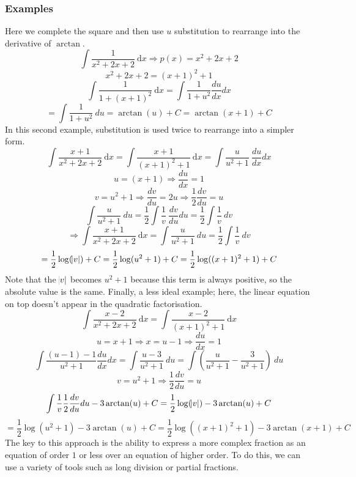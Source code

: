 \documentclass[12pt]{report}
\newcommand{\dx}{\:\mathrm{d}x}
\begin{document}
\begin{flushleft}
\subsubsection*{Examples}
Here we complete the square and then use \(u\) substitution to rearrange into
the derivative of \(\arctan\).
\[\int \frac{1}{x^2 + 2x + 2} \dx\Rightarrow p(x) = x^2 + 2x + 2\]
\[x^2 + 2x + 2 = (x + 1)^2 + 1\]
\[\int \frac{1}{1 + (x + 1)^2} \dx = \int \frac{1}{1 + u^2} \frac{du}{dx}dx\]
\[= \int \frac{1}{1 + u^2} \:du = \arctan(u) + C = \arctan(x + 1) + C\]
In this second example, substitution is used twice to rearrange into a simpler
form.
\[\int \frac{x + 1}{x^2 + 2x + 2} \dx = \int \frac{x + 1}{(x + 1)^2 + 1}\dx
= \int \frac{u}{u^2 + 1} \:\frac{du}{dx}dx\]
\[u = (x + 1) \Rightarrow \frac{du}{dx} = 1\]
\[v = u^2 + 1 \Rightarrow \frac{dv}{du} 
= 2u \Rightarrow \frac{1}{2}\frac{dv}{du} = u\]
\[\int \frac{u}{u^2 + 1} \:du = \frac{1}{2}\int\frac{1}{v}\:\frac{dv}{du}du
= \frac{1}{2}\int \frac{1}{v} \:dv\]
\[\Rightarrow \int \frac{x + 1}{x^2 + 2x + 2} \dx 
= \int \frac{u}{u^2 + 1} \:du = \frac{1}{2}\int \frac{1}{v} \:dv\]
\[= \frac{1}{2}\log(\abs{v}) + C = \frac{1}{2}\log(u^2 + 1) + C
= \frac{1}{2}\log((x + 1)^2 + 1) + C\]
Note that the \(\abs{v}\) becomes \(u^2 + 1\) because this term is always
positive, so the absolute value is the same. Finally, a less ideal example;
here, the linear equation on top doesn't appear in the quadratic factorisation.
\[\int\frac{x - 2}{x^2 + 2x + 2} \dx = \int\frac{x - 2}{(x + 1)^2 + 1} \dx\]
\[u = x + 1 \Rightarrow x = u - 1 \Rightarrow \frac{du}{dx} = 1\]
\[\int\frac{(u - 1) - 1}{u^2 + 1}\frac{du}{dx}dx =\int\frac{u - 3}{u^2 + 1}\:du
= \int\left(\frac{u}{u^2 + 1} - \frac{3}{u^2 + 1}\right)\:du\]
\[v = u^2 + 1 \Rightarrow \frac{1}{2}\frac{dv}{du} = u\]
\[\int \frac{1}{v}\frac{1}{2}\frac{dv}{du}du - 3\arctan(u) + C
= \frac{1}{2}\log(\abs{v}) - 3\arctan(u) + C\]
\[= \frac{1}{2}\log(u^2 + 1) - 3\arctan(u) + C 
= \frac{1}{2}\log((x + 1)^2 + 1) - 3\arctan(x + 1) + C\]
The key to this approach is the ability to express a more complex fraction as
an equation of order \(1\) or less over an equation of higher order. To do
this, we can use a variety of tools such as long division or partial fractions.


\end{flushleft}
\end{document}
